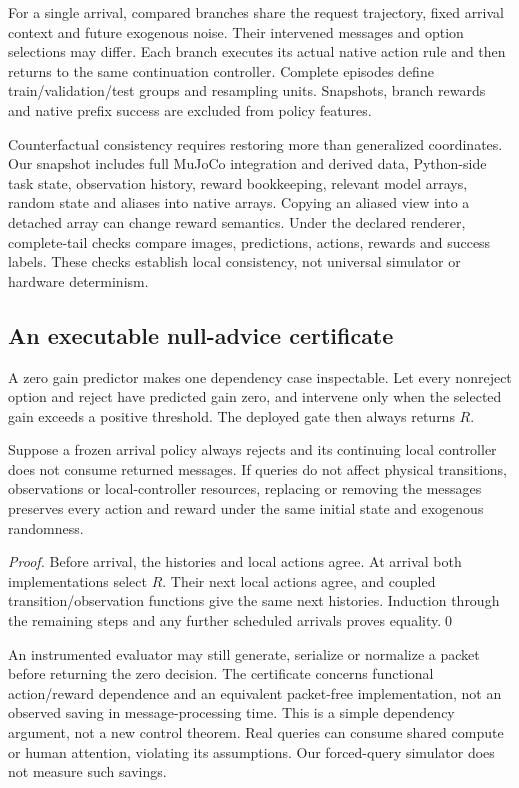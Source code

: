 For a single arrival, compared branches share the request trajectory, fixed arrival context and future exogenous noise. Their intervened messages and option selections may differ. Each branch executes its actual native action rule and then returns to the same continuation controller. Complete episodes define train/validation/test groups and resampling units. Snapshots, branch rewards and native prefix success are excluded from policy features.

Counterfactual consistency requires restoring more than generalized coordinates. Our snapshot includes full MuJoCo integration and derived data, Python-side task state, observation history, reward bookkeeping, relevant model arrays, random state and aliases into native arrays. Copying an aliased view into a detached array can change reward semantics. Under the declared renderer, complete-tail checks compare images, predictions, actions, rewards and success labels. These checks establish local consistency, not universal simulator or hardware determinism.

\subsection{An executable null-advice certificate}\label{sec:null}
A zero gain predictor makes one dependency case inspectable. Let every nonreject option and reject have predicted gain zero, and intervene only when the selected gain exceeds a positive threshold. The deployed gate then always returns $R$.
\begin{proposition}\label{prop:null}
Suppose a frozen arrival policy always rejects and its continuing local controller does not consume returned messages. If queries do not affect physical transitions, observations or local-controller resources, replacing or removing the messages preserves every action and reward under the same initial state and exogenous randomness.
\end{proposition}
\begin{proof}
Before arrival, the histories and local actions agree. At arrival both implementations select $R$. Their next local actions agree, and coupled transition/observation functions give the same next histories. Induction through the remaining steps and any further scheduled arrivals proves equality.\qed
\end{proof}
An instrumented evaluator may still generate, serialize or normalize a packet before returning the zero decision. The certificate concerns functional action/reward dependence and an equivalent packet-free implementation, not an observed saving in message-processing time. This is a simple dependency argument, not a new control theorem. Real queries can consume shared compute or human attention, violating its assumptions. Our forced-query simulator does not measure such savings.

